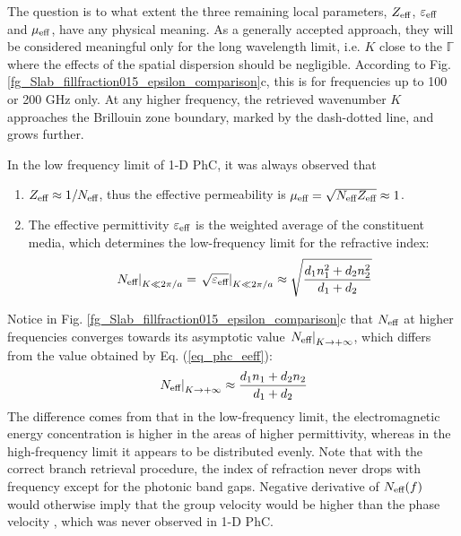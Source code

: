The question is to what extent the three remaining local parameters, $Z_{\text{eff} }$, $\varepsilon_{\text{eff} }$ and $\mu_{\text{eff} }$, have any physical meaning. As a generally accepted approach, they will be considered meaningful only for the long wavelength limit, i.e. $K$ close to the $\mathbb{\Gamma}$ where the effects of the spatial dispersion should be negligible. According to Fig. \ref{fg_Slab_fillfraction015_epsilon_comparison}c, this is for frequencies up to 100 or 200 GHz only. At any higher frequency, the retrieved wavenumber $K$ approaches the Brillouin zone boundary, marked by the dash-dotted line, and grows further.


In the low frequency limit of 1-D PhC, it was always observed that
\begin{enumerate}
\item{$Z_{\text{eff} } \approx 1/N_{\text{eff} }$, thus the effective permeability is $\mu_{\text{eff} } = \sqrt{N_{\text{eff} }Z_{\text{eff} }} \approx 1$.} 
\item{The effective permittivity $\varepsilon_{\text{eff} }$ is the weighted average of the constituent media, which determines the low-frequency limit for the refractive index:
	\begin{equation} \left.N_{\text{eff} }\right|_{K\ll 2\pi/a} =\left. \sqrt{\varepsilon_{\text{eff} }}\right|_{K\ll 2\pi/a} \approx \sqrt{\frac{d_1 n_1^{2} + d_2 n_2^{2}}{d_1+d_2}} \label{eq_phc_eeff}\end{equation}
	}
\end{enumerate}
Notice in Fig. \ref{fg_Slab_fillfraction015_epsilon_comparison}c that $N_{\text{eff} }$ at higher frequencies converges towards its asymptotic value $\left.N_{\text{eff} }\right|_{K\rightarrow +\infty}$, which differs from the value obtained by Eq. (\ref{eq_phc_eeff}):
\begin{equation} \left.N_{\text{eff} }\right|_{K\rightarrow +\infty} \approx \frac{d_1 n_1 + d_2 n_2}{d_1+d_2} \label{eq_phc_neff}\end{equation}
The difference comes from that in the low-frequency limit, the electromagnetic energy concentration is higher in the areas of higher permittivity, whereas in the high-frequency limit it appears to be distributed evenly.
Note that with the correct branch retrieval procedure, the index of refraction never drops with frequency except for the photonic band gaps. Negative derivative of $N_{\text{eff} }(f)$ would otherwise imply that the group velocity would be higher than the phase velocity \cite{mikki2009electromagnetic}, which was never observed in 1-D PhC.

